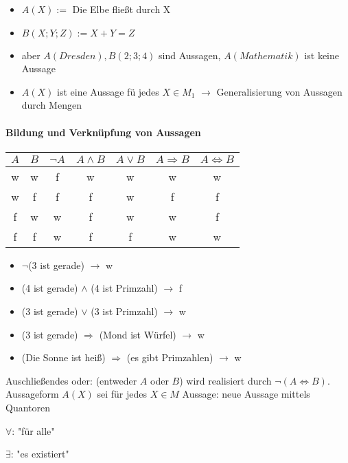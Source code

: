 \begin{exmpn}
	\begin{itemize}
		\item $A(X) := $ Die Elbe fließt durch X
		\item $B(X;Y;Z) := X + Y = Z$
		\item aber $A(Dresden) ,B(2;3;4)$ sind Aussagen, $A(Mathematik)$ ist keine Aussage
		\item $A(X)$ ist eine Aussage f\"u jedes $X \in M_1$ $\to$ Generalisierung von Aussagen durch Mengen
	\end{itemize}
\end{exmpn}

\paragraph{Bildung und Verknüpfung von Aussagen}

\begin{tabular}{|c|c|c|c|c|c|c|}
	\hline
	$A$ & $B$ & $\lnot A$ & $A \land B$ & $A \lor B$ & $A \Rightarrow B$ & $A \iff B$\\
	\hline
	w & w & f & w & w & w & w\\
	\hline
	w & f & f & f & w & f & f\\
	\hline
	f & w & w & f & w & w & f\\
	\hline
	f & f & w & f & f & w & w\\
	\hline
\end{tabular}

\begin{exmpn}
	\begin{itemize}
		\item $\lnot$(3 ist gerade) $\to$ w
		\item (4 ist gerade) $\land$ (4 ist Primzahl) $\to$ f
		\item (3 ist gerade) $\lor$ (3 ist Primzahl) $\to$ w
		\item (3 ist gerade) $\Rightarrow$ (Mond ist Würfel) $\to$ w
		\item (Die Sonne ist heiß) $\Rightarrow$ (es gibt Primzahlen) $\to$ w
	\end{itemize}
\end{exmpn}

\noindent Auschließendes oder: (entweder $A$ oder $B$) wird realisiert durch $\lnot(A \iff B)$.\\
Aussageform $A(X)$ sei f\"ur jedes $X \in M$ Aussage: neue Aussage mittels Quantoren

\begin{compactitem}
	\item $\forall$: "für alle"
	\item $\exists$: "es existiert"
\end{compactitem}

